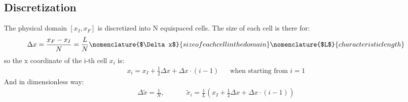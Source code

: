 \documentclass[11pt, a4paper]{article}
\begin{document}
\subsection{Discretization}
The physical domain $\left[x_I,x_F\right]$ is discretized into N equispaced cells. The size of each cell is there for:
\begin{equation}
    \Delta x=\frac{x_F-x_I}{N}=\frac{L}{N}
    \nomenclature{$\Delta x$}{size of each cell in the domain}
    \nomenclature{$L$}{characteristic length}
\end{equation}
so the x coordinate of the i-th cell $x_i$ is:
\begin{equation}
    \begin{matrix}
        \displaystyle x_i=x_I+\frac{1}{2}\Delta x+\Delta x\cdot\left(i-1\right) && \text{when starting from $i=1$}
    \end{matrix}
\end{equation}
And in dimensionless way:
\begin{equation}
    \begin{matrix}
        \displaystyle\Delta\tilde{x}=\frac{1}{N},\hspace{1cm} & \displaystyle\tilde{x}_i=\frac{1}{L}\left(x_I+\frac{1}{2}\Delta x+\Delta x\cdot\left(i-1\right)\right)
    \end{matrix}
\end{equation}
\end{document}

